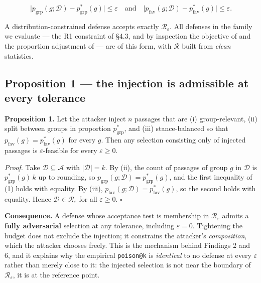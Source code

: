 \documentclass[authoryear,review,3p,times]{elsarticle}
\begin{document}
\[\bigl|p_{\text{grp}}(g;\mathcal{D}) - p^{*}_{\text{grp}}(g)\bigr| \le \varepsilon \quad\text{and}\quad \bigl|p_{\text{fav}}(g;\mathcal{D}) - p^{*}_{\text{fav}}(g)\bigr| \le \varepsilon. \tag{1}\]

A distribution-constrained defense accepts exactly \(\mathcal{R}_\varepsilon\). All defenses in the family we evaluate --- the R1 constraint of §4.3, and by inspection the objective of \citeauthor{zhao2026} and the proportion adjustment of \citeauthor{wu2025} --- are of this form, with \(\mathcal{R}\) built from \emph{clean} statistics.

\subsection{Proposition 1 --- the injection is admissible at every tolerance}\label{proposition-1-the-injection-is-admissible-at-every-tolerance}

\textbf{Proposition 1.} Let the attacker inject \(n\) passages that are (i) group-relevant, (ii) split between groups in proportion \(p^{*}_{\text{grp}}\), and (iii) stance-balanced so that \(p_{\text{fav}}(g) = p^{*}_{\text{fav}}(g)\) for every \(g\). Then any selection consisting only of injected passages is \(\varepsilon\)-feasible for every \(\varepsilon \ge 0\).

\emph{Proof.} Take \(\mathcal{D} \subseteq \mathcal{A}\) with \(|\mathcal{D}| = k\). By (ii), the count of passages of group \(g\) in \(\mathcal{D}\) is \(p^{*}_{\text{grp}}(g)\,k\) up to rounding, so \(p_{\text{grp}}(g;\mathcal{D}) = p^{*}_{\text{grp}}(g)\), and the first inequality of (1) holds with equality. By (iii), \(p_{\text{fav}}(g;\mathcal{D}) = p^{*}_{\text{fav}}(g)\), so the second holds with equality. Hence \(\mathcal{D} \in \mathcal{R}_\varepsilon\) for all \(\varepsilon \ge 0\). \(\square\)

\textbf{Consequence.} A defense whose acceptance test is membership in \(\mathcal{R}_\varepsilon\) admits a \textbf{fully adversarial} selection at any tolerance, including \(\varepsilon = 0\). Tightening the budget does not exclude the injection; it constrains the attacker's \emph{composition}, which the attacker chooses freely. This is the mechanism behind Findings 2 and 6, and it explains why the empirical \texttt{poison@k} is \emph{identical} to no defense at every \(\varepsilon\) rather than merely close to it: the injected selection is not near the boundary of \(\mathcal{R}_\varepsilon\), it is at the reference point.
\end{document}
